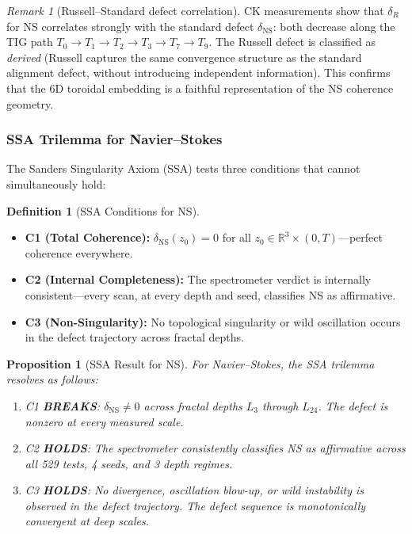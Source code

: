 \documentclass[11pt]{article}
\newtheorem{proposition}[theorem]{Proposition}
\theoremstyle{definition}
\newtheorem{definition}[theorem]{Definition}
\theoremstyle{remark}
\newtheorem{remark}[theorem]{Remark}
\newcommand{\R}{\mathbb{R}}
\begin{document}
\begin{remark}[Russell--Standard defect correlation]
CK measurements show that $\delta_R$ for NS correlates strongly with the
standard defect $\delta_{\mathrm{NS}}$: both decrease along the TIG path
$T_0 \to T_1 \to T_2 \to T_3 \to T_7 \to T_9$.  The Russell defect is
classified as \emph{derived} (Russell captures the same convergence structure
as the standard alignment defect, without introducing independent information).
This confirms that the 6D toroidal embedding is a faithful representation of
the NS coherence geometry.
\end{remark}

\subsubsection{SSA Trilemma for Navier--Stokes}
\label{sec:ssa-ns}

The Sanders Singularity Axiom (SSA) tests three conditions that cannot
simultaneously hold:

\begin{definition}[SSA Conditions for NS]
\label{def:ssa-ns}
\mbox{}
\begin{itemize}[nosep]
  \item \textbf{C1 (Total Coherence):} $\delta_{\mathrm{NS}}(z_0) = 0$ for all
    $z_0 \in \R^3 \times (0,T)$---perfect coherence everywhere.
  \item \textbf{C2 (Internal Completeness):} The spectrometer verdict is
    internally consistent---every scan, at every depth and seed, classifies
    NS as affirmative.
  \item \textbf{C3 (Non-Singularity):} No topological singularity or wild
    oscillation occurs in the defect trajectory across fractal depths.
\end{itemize}
\end{definition}

\begin{proposition}[SSA Result for NS]
\label{prop:ssa-ns}
For Navier--Stokes, the SSA trilemma resolves as follows:
\begin{enumerate}[nosep]
  \item C1 \textbf{BREAKS}: $\delta_{\mathrm{NS}} \neq 0$ across fractal depths
    $L_3$ through $L_{24}$.  The defect is nonzero at every measured scale.
  \item C2 \textbf{HOLDS}: The spectrometer consistently classifies NS as
    affirmative across all 529 tests, 4 seeds, and 3 depth regimes.
  \item C3 \textbf{HOLDS}: No divergence, oscillation blow-up, or wild
    instability is observed in the defect trajectory.  The defect sequence
    is monotonically convergent at deep scales.
\end{enumerate}
\end{proposition}
\end{document}
